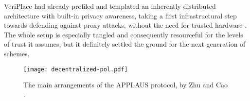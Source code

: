 VeriPlace had already profiled and templated an inherently distributed architecture with built-in privacy awareness, taking a first infrastructural step towards defending against proxy attacks, without the need for trusted hardware \cite{luo2010veriplace}. The whole setup is especially tangled and consequently resourceful for the levels of trust it assumes, but it definitely settled the ground for the next generation of \pol{} schemes. 

\begin{figure}[ht]
    \begin{center}
    \texttt{[image: decentralized-pol.pdf]}
    \caption{The main arrangements of the APPLAUS protocol, by Zhu and Cao \cite{zhu2011applaus}.}
    \label{fig:decentralized-pol}
    \end{center}
\end{figure}

